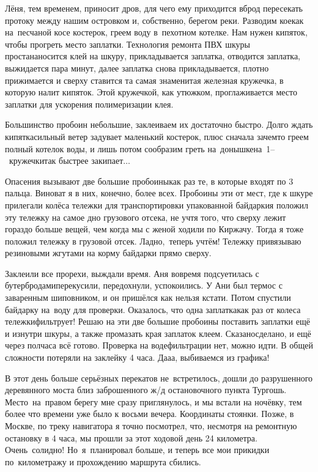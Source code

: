 Лёня, тем временем, приносит дров, для чего ему приходится вброд пересекать протоку между нашим островком и, собственно, берегом реки. Разводим кое\sdash как на~песчаной косе костерок, греем воду в~пехотном котелке. Нам нужен кипяток, чтобы прогреть место заплатки. Технология ремонта ПВХ шкуры проста\mdash наносится клей на шкуру, прикладывается заплатка, отводится заплатка, выжидается пара минут, далее заплатка снова прикладывается, плотно прижимается и сверху ставится та самая знаменитая железная кружечка, в которую налит кипяток. Этой кружечкой, как утюжком, проглаживается место заплатки для ускорения полимеризации клея. 

\newpage
Большинство пробоин небольшие, заклеиваем их достаточно быстро. Долго ждать кипятка\mdash сильный ветер задувает маленький костерок, плюс сначала зачем\sdash то греем полный котелок воды, и лишь потом сообразим греть на~донышке\mdash на~1\thinspace--~кружечки\mdash так быстрее закипает$\ldots$

Опасения вызывают две большие пробоины\mdash как раз те, в которые входят по 3 пальца. Виноват я в них, конечно, более всех. Пробоины эти от мест, где к шкуре прилегали колёса тележки для транспортировки упакованной байдарки\mdash я положил эту тележку на самое дно грузового отсека, не учтя того, что сверху лежит гораздо больше вещей, чем когда мы с женой ходили по Киржачу. Тогда я тоже положил тележку в грузовой отсек. Ладно,~теперь учтём! Тележку привязываю резиновыми жгутами на корму байдарки прямо сверху. 

Заклеили все прорехи, выждали время. Аня вовремя подсуетилась с бутербродами\mdash перекусили, передохнули, успокоились. У Ани был термос с заваренным шиповником, и он пришёлся как нельзя кстати. Потом спустили байдарку на~воду для проверки. Оказалось, что одна заплатка\mdash как раз от колеса тележки\mdash фильтрует! Решаю на эти две большие пробоины поставить заплатки ещё и изнутри шкуры, а также промазать края заплаток клеем. Сказано\mdash сделано, и ещё через полчаса всё готово. Проверка на воде\mdash фильтрации нет, можно идти. В общей сложности потеряли на заклейку 4 часа. Да\sdash а\sdash а, выбиваемся из графика! 

В этот день больше серьёзных перекатов не~встретилось, дошли до разрушенного деревянного моста близ заброшенного ж/д остановочного пункта Тургошь. Место~на~правом берегу мне сразу приглянулось, и мы встали на ночёвку, тем более что времени уже было к восьми вечера. Координаты стоянки\mdash \CoordsLidFifteenTurgosch. Позже, в Москве, по треку навигатора я точно посмотрел, что, несмотря на ремонтную остановку в 4 часа, мы прошли за этот ходовой день 24 километра. Очень~солидно! Но~я~планировал больше, и теперь все мои прикидки по~километражу и прохождению маршрута сбились.
 
